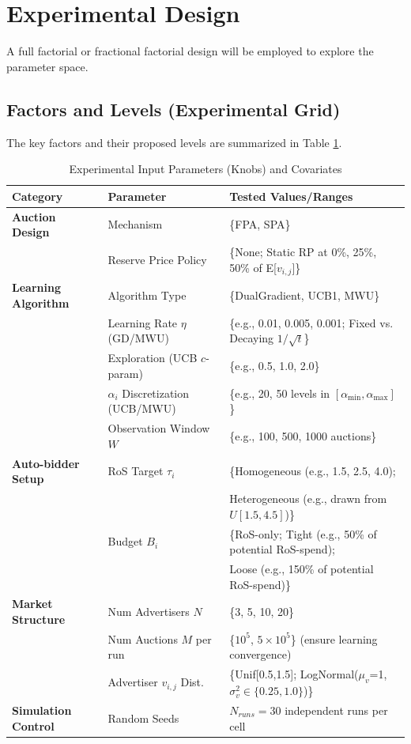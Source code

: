 \documentclass[12pt, a4paper]{article}
\begin{document}
\section{Experimental Design} \label{sec:experimental_design}
A full factorial or fractional factorial design will be employed to explore the parameter space.

\subsection{Factors and Levels (Experimental Grid)}
The key factors and their proposed levels are summarized in Table \ref{tab:experimental_grid_proposal}.

\begin{table}[h!]
    \centering
    \caption{Experimental Input Parameters (Knobs) and Covariates}
    \label{tab:experimental_grid_proposal}
    \small %
    \begin{tabular}{@{}lll@{}}
        \toprule
        \textbf{Category} & \textbf{Parameter} & \textbf{Tested Values/Ranges} \\ \midrule
        \textbf{Auction Design} & Mechanism & \{FPA, SPA\} \\
         & Reserve Price Policy & \{None; Static RP at 0\%, 25\%, 50\% of E[$v_{i,j}$]\} \\ \midrule
        \textbf{Learning Algorithm} & Algorithm Type & \{DualGradient, UCB1, MWU\} \\
         & Learning Rate $\eta$ (GD/MWU) & \{e.g., 0.01, 0.005, 0.001; Fixed vs. Decaying $1/\sqrt{t}$\} \\
         & Exploration (UCB $c$-param) & \{e.g., 0.5, 1.0, 2.0\} \\
         & $\alpha_i$ Discretization (UCB/MWU) & \{e.g., 20, 50 levels in $[\alpha_{\min}, \alpha_{\max}]$ \} \\
         & Observation Window $W$ & \{e.g., 100, 500, 1000 auctions\} \\ \midrule
        \textbf{Auto-bidder Setup} & RoS Target $\tau_i$ & \{Homogeneous (e.g., 1.5, 2.5, 4.0); \\
         & & Heterogeneous (e.g., drawn from $U[1.5, 4.5]$)\} \\
         & Budget $B_i$ & \{RoS-only; Tight (e.g., 50\% of potential RoS-spend); \\
         & & Loose (e.g., 150\% of potential RoS-spend)\} \\ \midrule
        \textbf{Market Structure} & Num Advertisers $N$ & \{3, 5, 10, 20\} \\
         & Num Auctions $M$ per run & \{$10^5$, $5 \times 10^5$\} (ensure learning convergence) \\
         & Advertiser $v_{i,j}$ Dist. & \{Unif[0.5,1.5]; LogNormal($\mu_v$=1, $\sigma_v^2 \in \{0.25, 1.0\}$)\} \\ \midrule
        \textbf{Simulation Control} & Random Seeds & $N_{runs}=30$ independent runs per cell \\
        \bottomrule
    \end{tabular}
\end{table}
\end{document}
